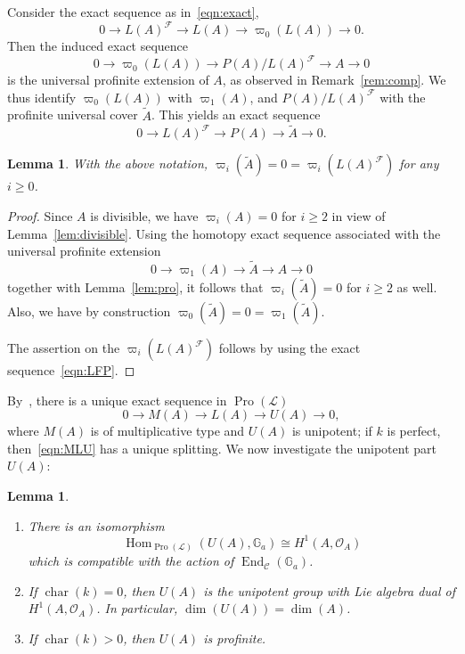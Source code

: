 \documentclass[11pt]{article}
\newtheorem{lemm}[theo]{Lemma}
\theoremstyle{definition}
\numberwithin{equation}{section}
\newcommand\bG{{\mathbb G}}
\newcommand\cC{{\mathcal C}}
\newcommand\cF{{\mathcal F}}
\newcommand\cL{{\mathcal L}}
\newcommand\cO{{\mathcal O}}
\newcommand\tA{{\widetilde A}}
\DeclareMathOperator{\charac}{char}
\DeclareMathOperator{\End}{End}
\DeclareMathOperator{\Hom}{Hom}
\DeclareMathOperator{\Pro}{Pro}
\theoremstyle{remark}
\newcommand*{\romanenumi}{}%
\begin{document}
Consider the exact sequence as in~\eqref{eqn:exact},
\[
0 \longrightarrow L(A)^{\cF} \longrightarrow L(A) \longrightarrow \varpi_0(L(A)) \longrightarrow 0.
\]
Then the induced exact sequence
\[
0 \longrightarrow \varpi_0(L(A)) \longrightarrow P(A)/L(A)^{\cF} \longrightarrow A \longrightarrow 0
\]
is the universal profinite extension of $A$, as observed in Remark~\ref{rem:comp}. We thus identify $\varpi_0(L(A))$ with $\varpi_1(A)$, and $P(A)/L(A)^{\cF}$ with the profinite universal cover $\tA$. This yields an exact sequence
\begin{equation}\label{eqn:LFP}
0 \longrightarrow L(A)^{\cF} \longrightarrow P(A) \longrightarrow \tA \longrightarrow 0.
\end{equation}

\begin{lemm}\label{lem:acyclic}
With the above notation, $\varpi_i(\tA) = 0 = \varpi_i(L(A)^{\cF})$ for any $i \geq 0$.
\end{lemm}

\begin{proof}
Since $A$ is divisible, we have $\varpi_i(A) = 0$ for $i \geq 2$ in view of Lemma~\ref{lem:divisible}. Using the homotopy exact sequence associated with the universal profinite extension
\[
0 \longrightarrow \varpi_1(A) \longrightarrow
\tA \longrightarrow A \longrightarrow 0
\]
together with Lemma~\ref{lem:pro}, it follows that $\varpi_i(\tA) = 0$ for $i \geq 2$ as well. Also, we have by construction $\varpi_0(\tA) = 0 = \varpi_1(\tA)$.

The assertion on the $\varpi_i(L(A)^{\cF})$ follows by using the exact sequence~\eqref{eqn:LFP}.
\end{proof}

By~\cite[IV.3.1.1]{DG}, there is a unique exact sequence in $\Pro(\cL)$
\begin{equation}\label{eqn:MLU}
0 \longrightarrow M(A) \longrightarrow L(A) \longrightarrow U(A) \longrightarrow 0,
\end{equation}
where $M(A)$ is of multiplicative type and $U(A)$ is unipotent; if $k$ is perfect, then~\eqref{eqn:MLU} has a unique splitting. We now investigate the unipotent part $U(A)$:

\begin{lemm}\label{lem:U(A)}\ 
\begin{enumerate}\romanenumi
\item \label{3.8.1} There is an isomorphism
\[
\Hom_{\Pro(\cL)}(U(A),\bG_a) \cong H^1(A,\cO_A)
\]
which is compatible with the action of $\End_{\cC}(\bG_a)$.
\item \label{3.8.2} If $\charac(k) = 0$, then $U(A)$ is the unipotent group with Lie algebra dual of $H^1(A,\cO_A)$. In particular, $\dim(U(A)) = \dim(A)$.
\item \label{3.8.3} If $\charac(k) > 0$, then $U(A)$ is profinite.
\end{enumerate}
\end{lemm}
\end{document}
